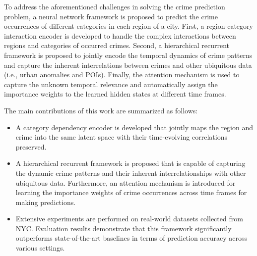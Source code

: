 To address the aforementioned challenges in solving the crime
prediction problem, a neural network framework is proposed to predict the crime occurrences of different categories in each region of a city. First, a region-category interaction encoder is developed to handle the complex interactions between regions and categories of occurred crimes. Second, a hierarchical recurrent framework is proposed to jointly encode the temporal dynamics of crime patterns and capture the inherent interrelations between crimes and other ubiquitous data (i.e., urban anomalies and POIs). Finally, the attention mechanism is used to capture the unknown temporal relevance and automatically assign the importance weights to the learned hidden states at different time frames.

\noindent The main contributions of this work are summarized as follows:
\begin{itemize}
    \item A category dependency encoder is developed that jointly maps the region and crime into the same latent space with their time-evolving correlations preserved.
    \item A hierarchical recurrent framework is proposed that is capable of capturing the dynamic crime patterns and their inherent interrelationships with other ubiquitous data. Furthermore, an attention mechanism is introduced for learning the importance weights of crime occurrences across time frames for making predictions.
    \item Extensive experiments are performed on real-world datasets collected from NYC. Evaluation results demonstrate that this framework significantly outperforms state-of-the-art baselines in terms of prediction accuracy across various settings.
\end{itemize}